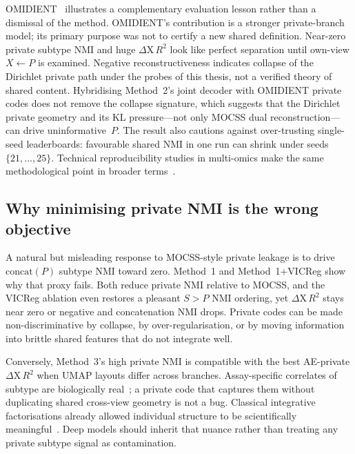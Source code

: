 OMIDIENT~\citep{Safinianaini_Välimäki_Bresson_Gorbonos_Rajamäki_Aaltonen_Marttinen_2025} illustrates a complementary evaluation lesson rather than a dismissal of the method. OMIDIENT's contribution is a stronger private-branch model; its primary purpose was not to certify a new shared definition. Near-zero private subtype NMI and huge $\Delta\mathrm{X}\,R^{2}$ look like perfect separation until own-view $X\leftarrow P$ is examined. Negative reconstructiveness indicates collapse of the Dirichlet private path under the probes of this thesis, not a verified theory of shared content. Hybridising Method~2's joint decoder with OMIDIENT private codes does not remove the collapse signature, which suggests that the Dirichlet private geometry and its KL pressure---not only MOCSS dual reconstruction---can drive uninformative~$P$. The result also cautions against over-trusting single-seed leaderboards: favourable shared NMI in one run can shrink under seeds $\{21,\ldots,25\}$. Technical reproducibility studies in multi-omics make the same methodological point in broader terms~\citep{baiao2025technical,rappoport2021evaluation}.

\subsection{Why minimising private NMI is the wrong objective}

A natural but misleading response to MOCSS-style private leakage is to drive $\mathrm{concat}(P)$ subtype NMI toward zero. Method~1 and Method~1+VICReg show why that proxy fails. Both reduce private NMI relative to MOCSS, and the VICReg ablation even restores a pleasant $S>P$ NMI ordering, yet $\Delta\mathrm{X}\,R^{2}$ stays near zero or negative and concatenation NMI drops. Private codes can be made non-discriminative by collapse, by over-regularisation, or by moving information into brittle shared features that do not integrate well.

Conversely, Method~3's high private NMI is compatible with the best AE-private $\Delta\mathrm{X}\,R^{2}$ when UMAP layouts differ across branches. Assay-specific correlates of subtype are biologically real~\citep{levine2013integrated,parker2009pam50}; a private code that captures them without duplicating shared cross-view geometry is not a bug. Classical integrative factorisations already allowed individual structure to be scientifically meaningful~\citep{lock2013jive,argelaguet2018multi}. Deep models should inherit that nuance rather than treating any private subtype signal as contamination.

